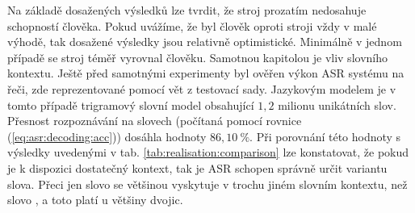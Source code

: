 Na základě dosažených výsledků lze tvrdit, že stroj prozatím nedosahuje schopností člověka.
Pokud uvážíme, že byl člověk oproti stroji vždy v malé výhodě, tak dosažené výsledky jsou relativně optimistické.
Minimálně v jednom případě se stroj téměř vyrovnal člověku.
Samotnou kapitolou je vliv slovního kontextu.
Ještě před samotnými experimenty byl ověřen výkon ASR systému na  řeči, zde reprezentované pomocí vět z testovací sady.
Jazykovým modelem je v tomto případě trigramový slovní model obsahující $1,2$ milionu unikátních slov.
Přesnost rozpoznávání na slovech (počítaná pomocí rovnice (\ref{eq:asr:decoding:acc})) dosáhla hodnoty $86,10\ \%$.
Při porovnání této hodnoty s výsledky uvedenými v tab. \ref{tab:realisation:comparison} lze konstatovat, že pokud je k dispozici dostatečný kontext, tak je ASR schopen správně určit variantu slova.
Přeci jen slovo  se většinou vyskytuje v trochu jiném slovním kontextu, než slovo , a toto platí u většiny dvojic.
